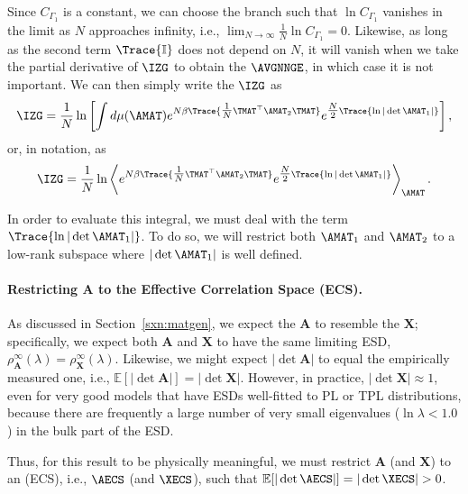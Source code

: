 \noindent
Since $C_{\Gamma_1}$ is a constant, we can choose the branch such that $\ln C_{\Gamma_1}$ vanishes in the limit as $N$ approaches infinity, i.e., $\lim_{N\rightarrow\infty}\frac{1}{N}\ln C_{\Gamma_1} = 0$.
Likewise, as long as the second term $\Trace{\mathbb{I}}$ does not depend on $N$, 
it will vanish when we take the partial derivative of $\IZG$ to obtain the $\AVGNNGE$, in which case it is not important.  
We can then simply write the \GeneratingFunction $\IZG$ as
\begin{align}
  \label{eqn:IZG_integral}
  \IZG 
   = \frac{1}{N} \ln \left[ \int d\mu(\AMAT)
    e^{N\beta \Trace{ \tfrac{1}{N}\TMAT^{\top}\AMAT_{2}\TMAT } }
    e^{\tfrac{N}{2}\Trace{\ln|\det\AMAT_{1}|}}\right]  ,
\end{align}
or, in \BraKet notation, as
\begin{align}
  \label{eqn:IZG_braket}
  \IZG = 
  \frac{1}{N} \ln\left\langle
  e^{N\beta \Trace{ \tfrac{1}{N}\TMAT^{\top}\AMAT_{2}\TMAT } }
  e^{\tfrac{N}{2}\Trace{\ln|\det\AMAT_{1}|}}
  \right\rangle_{\AMAT}   .
\end{align}

In order to evaluate this integral, we must deal with the term $\Trace{\ln|\det\AMAT_{1}|}$.
To do so, we will restrict both $\AMAT_{1}$ and $\AMAT_{2}$ to a low-rank subspace where $|\det\AMAT_{1}|$ is well defined.

\paragraph{Restricting $\mathbf{A}$ to the Effective Correlation Space (ECS).}

As discussed in Section~\ref{sxn:matgen}, 
we expect the \Student \CorrelationMatrix $\mathbf{A}$ to resemble the \Teacher \CorrelationMatrix $\mathbf{X}$;
specifically, we expect both $\mathbf{A}$ and $\mathbf{X}$ to have the same limiting ESD,
$\rho^{\infty}_{\mathbf{A}}(\lambda)=\rho^{\infty}_{\mathbf{X}}(\lambda)$.
Likewise, we might expect $|\det\mathbf{A}|$ to equal the empirically measured one, i.e.,
$\mathbb{E}[|\det\mathbf{A}|]=|\det\mathbf{X}|$.
However, in practice, 
$|\det\mathbf{X}|\approx 1$, 
even for very good models that have ESDs well-fitted to PL or TPL distributions, 
because there are frequently a large number of very small eigenvalues ($\ln\lambda < 1.0$) in the bulk part of the ESD. 
    
Thus, for this result to be physically meaningful, we must restrict $\mathbf{A}$ (and $\mathbf{X}$)
to an \EffectiveCorrelationSpace (ECS), 
i.e., $\AECS$ (and $\XECS$), such that $\mathbb{E}[|\det\AECS|]=|\det\XECS|>0$.
    
